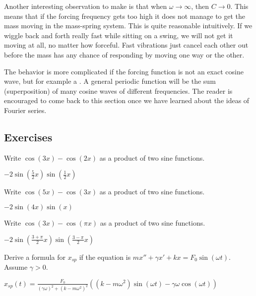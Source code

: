 
Another interesting observation to make is that when $\omega \to \infty$,
then $C \to 0$.  This means that if the forcing frequency gets too high it
does not manage to get the mass moving in the mass-spring system.  This is
quite reasonable intuitively.
If we wiggle back and forth really fast while sitting on a swing, we will
not get it moving at all, no matter how forceful.  Fast
vibrations just cancel each other out before the mass has any chance of
responding by moving one way or the other.

The behavior is more complicated if the forcing function is not an
exact cosine wave, but for example a .
A general periodic function will be the sum (superposition) of many
cosine waves of different frequencies.
The reader is encouraged to come
back to this section once we have learned about the ideas of Fourier series.

\subsection{Exercises}

\begin{exercise}
Write $\cos(3x) - \cos(2x)$ as a product of two sine functions.
\end{exercise}
\comboSol{%
}
{%
$-2\sin\left(\frac{5}{2}x\right)\sin\left(\frac{1}{2}x\right)$
}

\begin{exercise}
Write $\cos(5x) - \cos(3x)$ as a product of two sine functions.
\end{exercise}
\comboSol{%
}
{%
$-2\sin\left(4x\right)\sin\left(x\right)$
}

\begin{exercise}
Write $\cos(3x) - \cos(\pi x)$ as a product of two sine functions.
\end{exercise}
\comboSol{%
}
{%
$-2\sin\left(\frac{3+\pi}{2}x\right)\sin\left(\frac{3-\pi}{2}x\right)$
}

\begin{exercise}
Derive a formula for $x_{sp}$ if the equation is
$m x'' + \gamma x' + kx = F_0 \sin (\omega t)$.  Assume $\gamma > 0$.
\end{exercise}
\comboSol{%
}
{%
$x_{sp}(t) = \frac{F_0}{(\gamma \omega)^2 + (k - m\omega^2)^2}\left( (k - m\omega^2)\sin(\omega t) - \gamma \omega \cos(\omega t)\right)$
}

